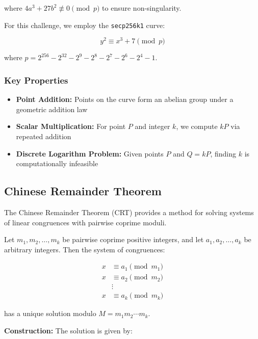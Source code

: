 \documentclass[11pt,a4paper]{article}
\begin{document}
where $4a^3 + 27b^2 \not\equiv 0 \pmod{p}$ to ensure non-singularity.

For this challenge, we employ the \texttt{secp256k1} curve:

\begin{equation}
y^2 \equiv x^3 + 7 \pmod{p}
\end{equation}

where $p = 2^{256} - 2^{32} - 2^9 - 2^8 - 2^7 - 2^6 - 2^4 - 1$.

\subsubsection{Key Properties}

\begin{itemize}
    \item \textbf{Point Addition:} Points on the curve form an abelian group under a geometric addition law
    \item \textbf{Scalar Multiplication:} For point $P$ and integer $k$, we compute $kP$ via repeated addition
    \item \textbf{Discrete Logarithm Problem:} Given points $P$ and $Q = kP$, finding $k$ is computationally infeasible
\end{itemize}

\subsection{Chinese Remainder Theorem}

The Chinese Remainder Theorem (CRT) provides a method for solving systems of linear congruences with pairwise coprime moduli.

\begin{theorem}
Let $m_1, m_2, \ldots, m_k$ be pairwise coprime positive integers, and let $a_1, a_2, \ldots, a_k$ be arbitrary integers. Then the system of congruences:

\begin{align}
x &\equiv a_1 \pmod{m_1} \\
x &\equiv a_2 \pmod{m_2} \\
&\vdots \\
x &\equiv a_k \pmod{m_k}
\end{align}

has a unique solution modulo $M = m_1 m_2 \cdots m_k$.
\end{theorem}

\textbf{Construction:} The solution is given by:
\end{document}
